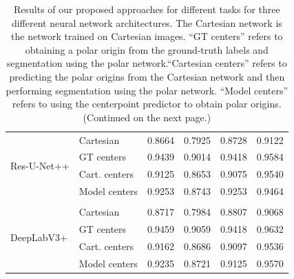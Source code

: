 \begin{table}[t!]
\begin{tabularx}{\textwidth}{X X c c c c}
 \multirow{4}{7em}{{Res-U-Net++}}
& Cartesian & 0.8664 & 0.7925 & 0.8728 & 0.9122 \\
& GT centers & 0.9439 & 0.9014 & 0.9418 & 0.9584 \\
& Cart. centers & 0.9125 & 0.8653 & 0.9075 & 0.9540 \\
& Model centers & 0.9253 & 0.8743 & 0.9253 & 0.9464 \\ [1ex]
\hline \\ [-1.5ex]

 \multirow{4}{7em}{{DeepLabV3+}}
& Cartesian & 0.8717 & 0.7984 & 0.8807 & 0.9068 \\
& GT centers & 0.9459 & 0.9059 & 0.9418 & 0.9632 \\
& Cart. centers & 0.9162 & 0.8686 & 0.9097 & 0.9536 \\
& Model centers & 0.9235 & 0.8721 & 0.9125 & 0.9570 \\ [1ex]
\end{tabularx}
\caption{Results of our proposed approaches for different tasks 
for three different neural network architectures. The Cartesian network is the network trained on Cartesian images. ``GT centers'' refers to obtaining a polar origin from the ground-truth labels and segmentation using the polar network.``Cartesian centers'' refers to predicting the polar origins from the Cartesian network and then performing segmentation using the polar network. ``Model centers'' refers to using the centerpoint predictor to obtain polar origins. (Continued on the next page.)}
\label{table:results}
\end{table}

